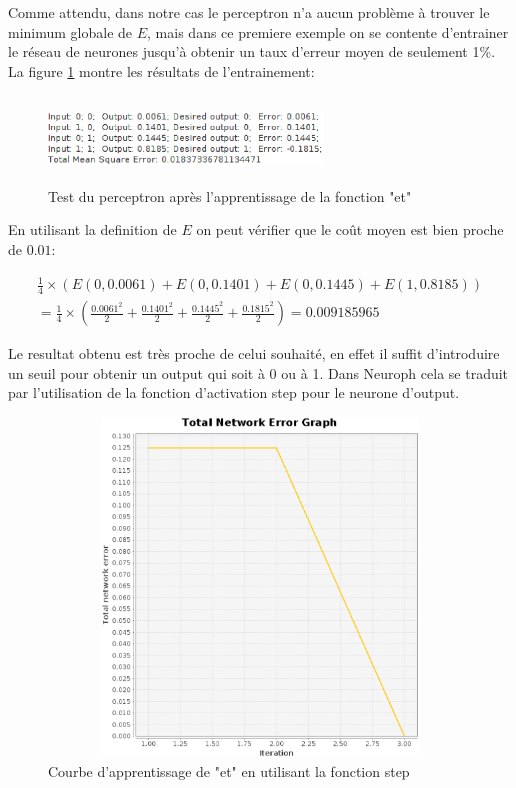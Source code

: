 \documentclass[twoside,openright,a4paper,11pt,french]{article}
\begin{document}
Comme attendu, dans notre cas le perceptron n'a aucun problème à trouver le
minimum globale de $E$, mais dans ce premiere exemple on se contente d'entrainer le
réseau de neurones jusqu'à obtenir un taux d'erreur moyen de seulement 1\%. La
figure \ref{fig:andtest1} montre les résultats de l'entrainement:

\begin{figure}[ht]
\centering
\includegraphics[width=7.3cm,height=2.3cm]{./pics/andtest1.eps}
\caption{Test du perceptron après l'apprentissage de la fonction "et"}
\label{fig:andtest1}
\end{figure}

En utilisant la definition de $E$ on peut vérifier que le coût
moyen est bien proche de $0.01$:

\begin{equation*}
  \begin{aligned}
  \tfrac{1}{4}\times(E(0,0.0061)+E(0,0.1401)+E(0,0.1445)+E(1,0.8185))\\
  = \tfrac{1}{4}\times(\tfrac{0.0061^2}{2}+\tfrac{0.1401^2}{2}+\tfrac{0.1445^2}{2}+\tfrac{0.1815^2}{2}) =
  0.009185965
  \end{aligned}
\end{equation*}

Le resultat obtenu est très proche de celui souhaité, en effet il suffit 
d'introduire un seuil pour obtenir un output qui soit à 0 ou à 1.
Dans Neuroph cela se traduit par l'utilisation de la fonction d'activation step pour le
neurone d'output.


\begin{figure}[ht]
\centering
\includegraphics[width=12cm,height=9cm]{./pics/and_error2.eps}
\caption{Courbe d'apprentissage de "et" en utilisant la fonction step}
\label{fig:anderr}
\end{figure}
\end{document}
